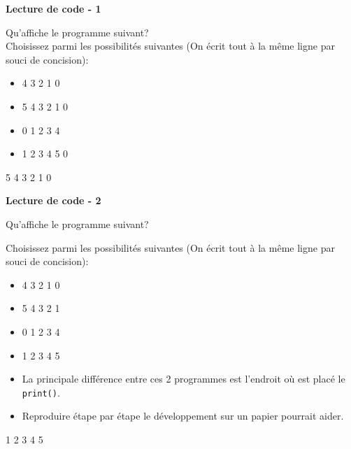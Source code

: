 \begin{Exercice}[5 minutes] [Python] \textbf{Lecture de code - 1} 
	
	Qu'affiche le programme suivant? \\ 
	
	 
	
	Choisissez parmi les possibilités suivantes (On écrit tout à la même ligne par souci de concision): \\
	
	\begin{itemize}
	\item 4  
	3 
	2 
	1 
	0 
	\item 5 
	4 
	3 
	2 
    1 
    0
	\item 0 
	1 
	2 
	3 
	4 
	\item 1 
	2 
	3 
	4
    5
    0
    \end{itemize}
    \begin{solution} 
			5  
			4  
			3  
			2  
			1  
			0  
		\end{solution} 
    
\end{Exercice}

\begin{Exercice}[5 minutes] [Python] \textbf{Lecture de code - 2}
    
	Qu'affiche le programme suivant?
	
	
	Choisissez parmi les possibilités suivantes (On écrit tout à la même ligne par souci de concision): \\
	
	\begin{itemize}
	\item 4  
	3 
	2 
	1 
	0 
	\item 5 
	4 
	3 
	2 
	1 
	\item 0 
	1 
	2 
	3 
	4 
	\item 1 
	2 
	3 
	4 
	5
	\end{itemize}
	
	 
	
		\begin{conseil} 
		\begin{itemize} 
			\item La principale différence entre ces 2 programmes est l'endroit où est placé le \lstinline{print()}. 
			\item Reproduire étape par étape le développement sur un papier pourrait aider. 
		\end{itemize} 
		\end{conseil} 
	
		\begin{solution}  
			1  
			2  
			3  
			4  
			5 
	
		\end{solution} 
	
\end{Exercice}

